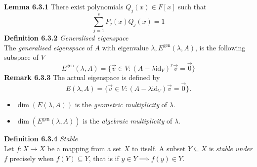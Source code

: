 \documentclass[8pt,landscape]{article}
\begin{document}
\begin{multicols}{3}
    \textbf{Lemma 6.3.1}
    There exist polynomials $Q_j(x) \in F[x]$ such that
    \[
        \sum_{j=1}^s P_j(x) Q_j(x) = 1
    \]
    \textbf{Definition 6.3.2} \emph{Generalised eigenspace} \\
    The \emph{generalised eigenspace} of $A$ with eigenvalue
    $\lambda, E^{\mathrm{gen}}(\lambda, A)$, is the following subspace of $V$
    \[
        E^{\mathrm{gen}} (\lambda, A) =
        \{\vec{v} \in V : {(A - \lambda \mathrm{id}_V)}^{r} \vec{v} = \vec{0} \}
    \]
    \textbf{Remark 6.3.3}
    The actual eigenspace is defined by
    \[
        E(\lambda, A) = \{ \vec{v} \in V : (A - \lambda \mathrm{id}_V)
        \vec{v} = \vec{0} \}.
    \]
    \begin{itemize}
        \item $\dim(E(\lambda, A))$ is the \emph{geometric multiplicity} of $\lambda$.
        \item $\dim(E^{\mathrm{gen}}(\lambda, A))$ is the \emph{algebraic multiplicity} of $\lambda$.
    \end{itemize}

    \textbf{Definition 6.3.4} \emph{Stable} \\
    Let $f : X \to X$ be a mapping from a set $X$ to itself.
    A subset $Y \subseteq X$ is \emph{stable under $f$} precisely when
    $f(Y) \subseteq Y$, that is if $y \in Y \implies f(y) \in Y$.


\end{multicols}
\end{document}
